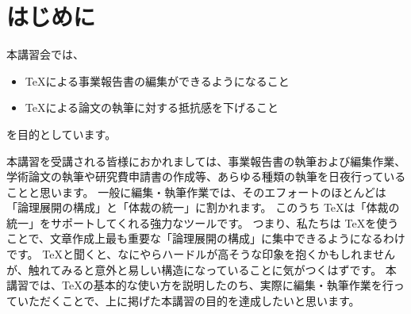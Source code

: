 \documentclass[TeXworkshop]{subfiles}
\begin{document}
\section{はじめに}

本講習会では、
\begin{itemize}
\item \TeX による事業報告書の編集ができるようになること
\item \TeX による論文の執筆に対する抵抗感を下げること
\end{itemize}
を目的としています。

本講習を受講される皆様におかれましては、事業報告書の執筆および編集作業、学術論文の執筆や研究費申請書の作成等、あらゆる種類の執筆を日夜行っていることと思います。
一般に編集・執筆作業では、そのエフォートのほとんどは「論理展開の構成」と「体裁の統一」に割かれます。
このうち \TeX は「体裁の統一」をサポートしてくれる強力なツールです。
つまり、私たちは \TeX を使うことで、文章作成上最も重要な「論理展開の構成」に集中できるようになるわけです。
\TeX と聞くと、なにやらハードルが高そうな印象を抱くかもしれませんが、触れてみると意外と易しい構造になっていることに気がつくはずです。
本講習では、\TeX の基本的な使い方を説明したのち、実際に編集・執筆作業を行っていただくことで、上に掲げた本講習の目的を達成したいと思います。
\end{document}

